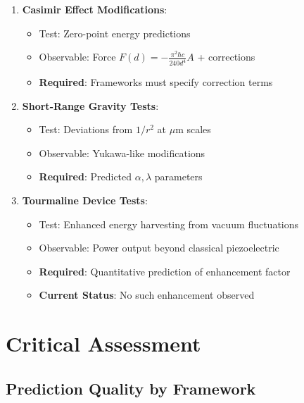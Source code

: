 \begin{enumerate}
    \item \textbf{Casimir Effect Modifications}:
    \begin{itemize}
        \item Test: Zero-point energy predictions
        \item Observable: Force $F(d) = -\frac{\pi^2 \hbar c}{240 d^4} A$ + corrections
        \item \textbf{Required}: Frameworks must specify correction terms
    \end{itemize}

    \item \textbf{Short-Range Gravity Tests}:
    \begin{itemize}
        \item Test: Deviations from $1/r^2$ at $\mu$m scales
        \item Observable: Yukawa-like modifications
        \item \textbf{Required}: Predicted $\alpha, \lambda$ parameters
    \end{itemize}

    \item \textbf{Tourmaline Device Tests}:
    \begin{itemize}
        \item Test: Enhanced energy harvesting from vacuum fluctuations
        \item Observable: Power output beyond classical piezoelectric
        \item \textbf{Required}: Quantitative prediction of enhancement factor
        \item \textbf{Current Status}: No such enhancement observed
    \end{itemize}
\end{enumerate}

\section{Critical Assessment}

\subsection{Prediction Quality by Framework}

